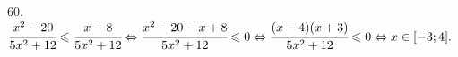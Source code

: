 60. $\cfrac{x^2-20}{5x^2+12}\leqslant\cfrac{x-8}{5x^2+12}\Leftrightarrow\cfrac{x^2-20-x+8}{5x^2+12}\leqslant0\Leftrightarrow
\cfrac{(x-4)(x+3)}{5x^2+12}\leqslant0\Leftrightarrow x\in [-3;4].$\\
